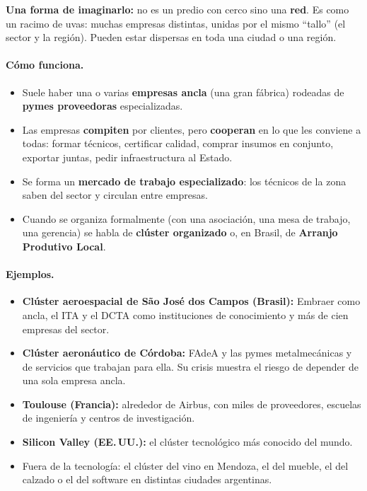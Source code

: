 \textbf{Una forma de imaginarlo:} no es un predio con cerco sino una \textbf{red}. Es como un
racimo de uvas: muchas empresas distintas, unidas por el mismo ``tallo'' (el sector y la
región). Pueden estar dispersas en toda una ciudad o una región.

\paragraph*{Cómo funciona.}
\begin{itemize}
  \item Suele haber una o varias \textbf{empresas ancla} (una gran fábrica) rodeadas de
        \textbf{pymes proveedoras} especializadas.
  \item Las empresas \textbf{compiten} por clientes, pero \textbf{cooperan} en lo que les
        conviene a todas: formar técnicos, certificar calidad, comprar insumos en conjunto,
        exportar juntas, pedir infraestructura al Estado.
  \item Se forma un \textbf{mercado de trabajo especializado}: los técnicos de la zona saben
        del sector y circulan entre empresas.
  \item Cuando se organiza formalmente (con una asociación, una mesa de trabajo, una
        gerencia) se habla de \textbf{clúster organizado} o, en Brasil, de
        \textbf{Arranjo Produtivo Local}.
\end{itemize}

\paragraph*{Ejemplos.}
\begin{itemize}
  \item \textbf{Clúster aeroespacial de São José dos Campos (Brasil):} Embraer como ancla, el
        ITA y el DCTA como instituciones de conocimiento y más de cien empresas del sector.
  \item \textbf{Clúster aeronáutico de Córdoba:} FAdeA y las pymes metalmecánicas y de
        servicios que trabajan para ella. Su crisis muestra el riesgo de depender de una sola
        empresa ancla.
  \item \textbf{Toulouse (Francia):} alrededor de Airbus, con miles de proveedores, escuelas de
        ingeniería y centros de investigación.
  \item \textbf{Silicon Valley (EE.\,UU.):} el clúster tecnológico más conocido del mundo.
  \item Fuera de la tecnología: el clúster del vino en Mendoza, el del mueble, el del calzado o
        el del software en distintas ciudades argentinas.
\end{itemize}


